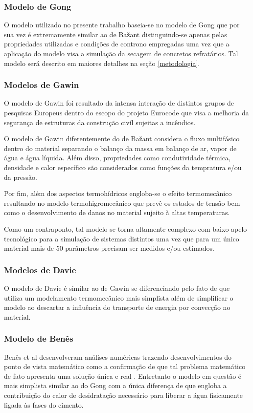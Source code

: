     \subsubsection{Modelo de Gong}
    O modelo utilizado no presente trabalho baseia-se no modelo de Gong
    \cite{Gong1995a} que por sua vez é extremamente similar ao de Ba\v{z}ant
    distinguindo-se apenas pelas propriedades utilizadas e condições de controno
    empregadas uma vez que a aplicação do modelo visa a simulação da secagem de
    concretos refratários. Tal modelo será descrito em maiores detalhes na seção
    \ref{metodologia}.
    
    
    \subsubsection{Modelos de Gawin}
    O modelo de Gawin\cite{Gawin1999}  foi resultado da intensa interação de distintos grupos de
    pesquisas Europeus dentro do escopo do projeto Eurocode \cite{Eurocode} que
    visa a melhoria da segurança de estruturas da construção civíl sujeitas a
    incêndios.

    O modelo de Gawin diferentemente do de Ba\v{z}ant considera o fluxo
    multifásico dentro do material separando o balanço da massa em balanço de
    ar, vapor de água e água líquida. Além disso, propriedades como
    condutividade térmica, densidade e calor específico são considerados como
    funções da tempratura e/ou da pressão.

    Por fim, além dos aspectos termohídricos engloba-se o efeito termomecânico
    resultando no modelo termohigromecânico que prevê os estados de tensão bem
    como o desenvolvimento de danos no material sujeito à altas temperaturas.

    Como um contraponto, tal modelo se torna altamente complexo com baixo apelo
    tecnológico para a simulação de sistemas distintos uma vez que para um único
    material mais de 50 parâmetros precisam ser medidos e/ou estimados.
    
    \subsubsection{Modelos de Davie}
    O modelo de Davie é similar ao de Gawin se diferenciando pelo fato de que
    utiliza um modelamento termomecânico mais simplista além de simplificar o
    modelo ao descartar a influência do transporte de energia por convecção no
    material.
    
    \subsubsection{Modelo de Ben\v{e}s}
    Ben\v{e}s et al desenvolveram análises numéricas trazendo desenvolvimentos
    do ponto de vista matemático como a confirmação de que tal problema
    matemático de fato apresenta uma solução única e real \cite{Benes2013a}.
    Entretanto o modelo em questão é mais simplista similar ao do Gong com a
    única diferença de que engloba a contribuição do calor de desidratação
    necessário para liberar a água fisicamente ligada às fases do cimento.
    
